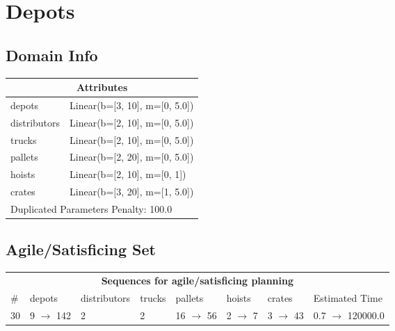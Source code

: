 \documentclass{article}
\begin{document}
                            \newpage \section{Depots}
                    \subsection*{Domain Info}

                    \begin{center}
                    \begin{tabular}{@{}p{}p{}@{}}
                    \multicolumn{2}{c}{\bf \large Attributes}\\\midrule
                    depots & Linear(b=[3, 10], m=[0, 5.0])\\
distributors & Linear(b=[2, 10], m=[0, 5.0])\\
trucks & Linear(b=[2, 10], m=[0, 5.0])\\
pallets & Linear(b=[2, 20], m=[0, 5.0])\\
hoists & Linear(b=[2, 10], m=[0, 1])\\
crates & Linear(b=[3, 20], m=[1, 5.0])
                    
                     \\\midrule
                    \multicolumn{2}{l}{Duplicated Parameters Penalty: 100.0}
                    \end{tabular}
                    \end{center}
                
                         \subsection*{Agile/Satisficing Set}

                        \begin{center}
                        \begin{tabular}{@{}l|l|l|l|l|l|l|l@{}}
                        \multicolumn{8}{c}{\bf \large Sequences for agile/satisficing planning}\\
                        \# & depots & distributors & trucks & pallets & hoists & crates & Estimated Time\\\midrule
                        30&9 $\rightarrow$ 142&2&2&16 $\rightarrow$ 56&2 $\rightarrow$ 7&3 $\rightarrow$ 43&0.7 $\rightarrow$ 120000.0
                        \end{tabular}
                        \end{center}
                    
\end{document}
